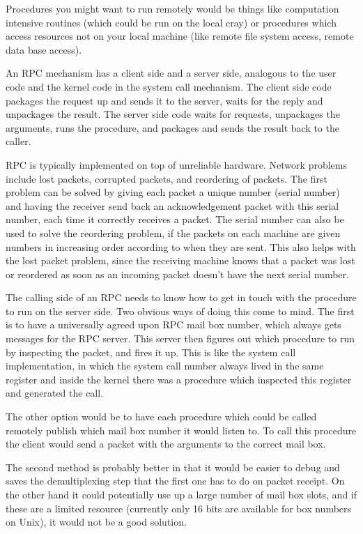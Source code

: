 Procedures you might want to run remotely would be things like computation
intensive routines (which could be run on the local cray) or
procedures which access resources not on your local machine (like remote
file system access, remote data base access).

An RPC mechanism has a client side and a server side, analogous
to the user code and the kernel code in the system call mechanism.
The client side code packages the request up and sends it to the server,
waits for the reply and unpackages the result.  The server side
code waits for requests, unpackages the arguments, runs the procedure,
and packages and sends the result back to the caller.

RPC is typically implemented on top of unreliable hardware.  Network problems
include lost packets, corrupted packets, and reordering of packets.  The
first problem can be solved by giving each packet a unique number (serial
number) and having the receiver send back an acknowledgement packet with
this serial number, each time it correctly receives a packet.  The serial
number can also be used to solve the reordering problem, if the packets on
each machine are given numbers in increasing order according to when they are
sent.  This also helps with the lost packet problem, since the receiving 
machine knows that a packet was lost or reordered as soon as an incoming packet
doesn't have the next serial number.

The calling side of an RPC needs to know how to get in touch with the
procedure to run on the server side.  Two obvious ways of doing this come
to mind.  The first is to have a universally agreed upon RPC mail box
number, which always gets messages for the RPC server.  This server then
figures out which procedure to run by inspecting the packet, and fires it
up.  This is like the system call implementation, in which the system call
number always lived in the same register and inside the kernel there was a
procedure which inspected this register and generated the call.

The other option would be to have each procedure which could be called
remotely publish which mail box number it would listen to.  To call this
procedure the client would send a packet with the arguments to the correct
mail box.

The second method is probably better in that it would be easier to debug and
saves the demultiplexing step that the first one has to do on packet receipt.
On the other hand it could potentially use up a large number of mail box slots,
and if these are a limited resource (currently only 16 bits are available for
box numbers on Unix), it would not be a good solution.

